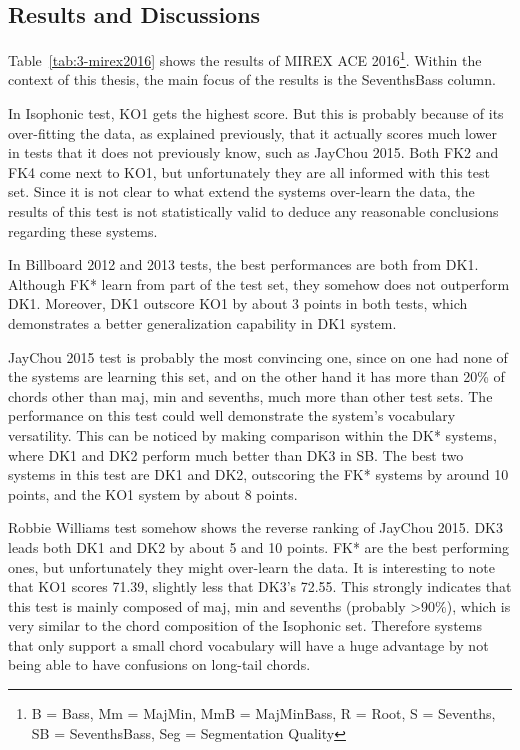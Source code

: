 \subsection{Results and Discussions}
Table~\ref{tab:3-mirex2016} shows the results of MIREX ACE 2016\footnote{B = Bass, Mm = MajMin, MmB = MajMinBass, R = Root, S = Sevenths, SB = SeventhsBass, Seg = Segmentation Quality}. Within the context of this thesis, the main focus of the results is the SeventhsBass column.

In Isophonic test, KO1 gets the highest score. But this is probably because of its over-fitting the data, as explained previously, that it actually scores much lower in tests that it does not previously know, such as JayChou 2015. Both FK2 and FK4 come next to KO1, but unfortunately they are all informed with this test set. Since it is not clear to what extend the systems over-learn the data, the results of this test is not statistically valid to deduce any reasonable conclusions regarding these systems.

In Billboard 2012 and 2013 tests, the best performances are both from DK1. Although FK* learn from part of the test set, they somehow does not outperform DK1. Moreover, DK1 outscore KO1 by about 3 points in both tests, which demonstrates a better generalization capability in DK1 system.

JayChou 2015 test is probably the most convincing one, since on one had none of the systems are learning this set, and on the other hand it has more than 20\% of chords other than maj, min and sevenths, much more than other test sets. The performance on this test could well demonstrate the system's vocabulary versatility. This can be noticed by making comparison within the DK* systems, where DK1 and DK2 perform much better than DK3 in SB. The best two systems in this test are DK1 and DK2, outscoring the FK* systems by around 10 points, and the KO1 system by about 8 points.

Robbie Williams test somehow shows the reverse ranking of JayChou 2015. DK3 leads both DK1 and DK2 by about 5 and 10 points. FK* are the best performing ones, but unfortunately they might over-learn the data. It is interesting to note that KO1 scores 71.39, slightly less that DK3's 72.55. This strongly indicates that this test is mainly composed of maj, min and sevenths (probably >90\%), which is very similar to the chord composition of the Isophonic set. Therefore systems that only support a small chord vocabulary will have a huge advantage by not being able to have confusions on long-tail chords.

